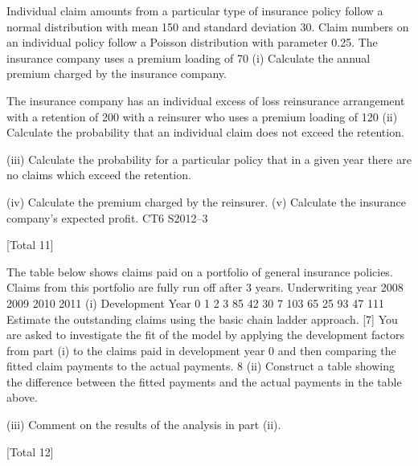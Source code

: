 \documentclass[a4paper,12pt]{article}
\begin{document}
Individual claim amounts from a particular type of insurance policy follow a normal
distribution with mean 150 and standard deviation 30. Claim numbers on an
individual policy follow a Poisson distribution with parameter 0.25. The insurance
company uses a premium loading of 70%
(i)
Calculate the annual premium charged by the insurance company.

The insurance company has an individual excess of loss reinsurance arrangement with
a retention of 200 with a reinsurer who uses a premium loading of 120%
(ii)
Calculate the probability that an individual claim does not exceed the
retention.

(iii) Calculate the probability for a particular policy that in a given year there are
no claims which exceed the retention.

(iv) Calculate the premium charged by the reinsurer.
(v) Calculate the insurance company’s expected profit.
CT6 S2012–3


[Total 11]



The table below shows claims paid on a portfolio of general insurance policies.
Claims from this portfolio are fully run off after 3 years.
Underwriting year
2008
2009
2010
2011
(i)
Development Year
0
1
2
3
85 42 30 7
103 65 25
93 47
111
Estimate the outstanding claims using the basic chain ladder approach.
[7]
You are asked to investigate the fit of the model by applying the development factors
from part (i) to the claims paid in development year 0 and then comparing the fitted
claim payments to the actual payments.
8
(ii) Construct a table showing the difference between the fitted payments and the
actual payments in the table above.

(iii) Comment on the results of the analysis in part (ii).

[Total 12]

\end{document}
